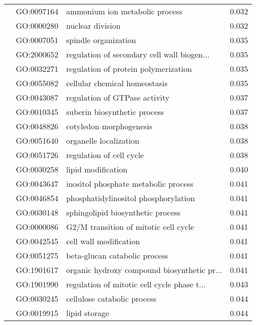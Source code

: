 \begin{longtable}{lllr}
   & GO:0097164 &               ammonium ion metabolic process &         0.032 \\
   & GO:0000280 &                             nuclear division &         0.032 \\
   & GO:0007051 &                         spindle organization &         0.035 \\
   & GO:2000652 &  regulation of secondary cell wall biogen... &         0.035 \\
   & GO:0032271 &         regulation of protein polymerization &         0.035 \\
   & GO:0055082 &                cellular chemical homeostasis &         0.035 \\
   & GO:0043087 &                regulation of GTPase activity &         0.037 \\
   & GO:0010345 &                 suberin biosynthetic process &         0.037 \\
   & GO:0048826 &                      cotyledon morphogenesis &         0.038 \\
   & GO:0051640 &                       organelle localization &         0.038 \\
   & GO:0051726 &                     regulation of cell cycle &         0.038 \\
   & GO:0030258 &                           lipid modification &         0.040 \\
   & GO:0043647 &         inositol phosphate metabolic process &         0.041 \\
   & GO:0046854 &         phosphatidylinositol phosphorylation &         0.041 \\
   & GO:0030148 &            sphingolipid biosynthetic process &         0.041 \\
   & GO:0000086 &        G2/M transition of mitotic cell cycle &         0.041 \\
   & GO:0042545 &                       cell wall modification &         0.041 \\
   & GO:0051275 &                beta-glucan catabolic process &         0.041 \\
   & GO:1901617 &  organic hydroxy compound biosynthetic pr... &         0.041 \\
   & GO:1901990 &  regulation of mitotic cell cycle phase t... &         0.043 \\
   & GO:0030245 &                  cellulose catabolic process &         0.044 \\
   & GO:0019915 &                                lipid storage &         0.044 \\

\end{longtable}
